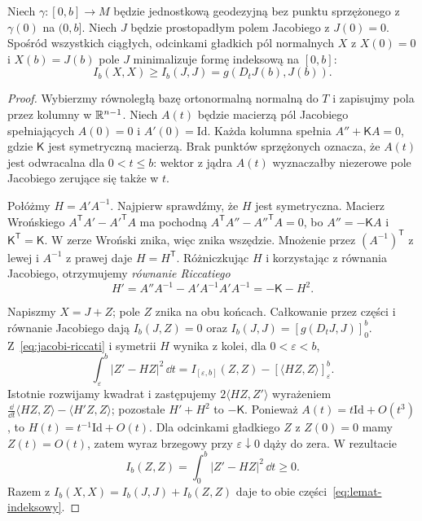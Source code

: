 \begin{lemat}[Indeksowy]
\label{lem:indeksowy-porownanie}
Niech $\gamma:[0,b]\to M$ będzie jednostkową
geodezyjną bez punktu sprzężonego z $\gamma(0)$
na $(0,b]$. Niech $J$ będzie prostopadłym
polem Jacobiego z $J(0)=0$. Spośród wszystkich
ciągłych, odcinkami gładkich pól normalnych $X$ z
$X(0)=0$ i $X(b)=J(b)$ pole $J$ minimalizuje
formę indeksową na $[0,b]$:
\begin{equation}\label{eq:lemat-indeksowy}
 I_b(X,X)\geq I_b(J,J)
       =g(D_tJ(b),J(b)).
\end{equation}
\end{lemat}
\begin{proof}
Wybierzmy równoległą bazę ortonormalną
normalną do $T$ i zapisujmy pola przez
kolumny w $\mathbb{R}^{n-1}$. Niech $A(t)$ będzie
macierzą pól Jacobiego spełniających
$A(0)=0$ i $A'(0)=\mathrm{Id}$.
Każda kolumna spełnia
$A''+\mathsf K A=0$, gdzie $\mathsf K$
jest symetryczną macierzą. Brak punktów
sprzężonych oznacza, że $A(t)$ jest odwracalna
dla $0<t\leq b$: wektor z jądra $A(t)$
wyznaczałby niezerowe pole Jacobiego zerujące
się także w $t$.

Połóżmy $H=A'A^{-1}$. Najpierw sprawdźmy,
że $H$ jest symetryczna. Macierz Wrońskiego
$A^{\mathsf T}A'-A'^{\mathsf T}A$ ma pochodną
$A^{\mathsf T}A''-A''^{\mathsf T}A=0$,
bo $A''=-\mathsf K A$ i $\mathsf K^{\mathsf T}
=\mathsf K$. W zerze Wroński znika, więc
znika wszędzie. Mnożenie przez
$(A^{-1})^{\mathsf T}$ z lewej i $A^{-1}$
z prawej daje $H=H^{\mathsf T}$.
Różniczkując $H$ i korzystając z równania
Jacobiego, otrzymujemy \emph{równanie Riccatiego}
\begin{equation}\label{eq:jacobi-riccati}
 H'=A''A^{-1}-A'A^{-1}A'A^{-1}
    =-\mathsf K-H^2.
\end{equation}

Napiszmy $X=J+Z$; pole $Z$ znika na obu
końcach. Całkowanie przez części i równanie
Jacobiego dają $I_b(J,Z)=0$ oraz
$I_b(J,J)=[g(D_tJ,J)]_0^b$.
Z~\eqref{eq:jacobi-riccati} i symetrii $H$
wynika z kolei, dla $0<\varepsilon<b$,
\[
 \int_\varepsilon^b|Z'-HZ|^2\,\dd t
 =I_{[\varepsilon,b]}(Z,Z)
   -[\langle HZ,Z\rangle]_{\varepsilon}^{b}.
\]
Istotnie rozwijamy kwadrat i zastępujemy
$2\langle HZ,Z'\rangle$ wyrażeniem
$\frac{\dd}{\dd t}\langle HZ,Z\rangle-\langle H'Z,Z\rangle$;
pozostałe $H'+H^2$ to $-\mathsf K$.
Ponieważ $A(t)=t\mathrm{Id}+O(t^3)$,
to $H(t)=t^{-1}\mathrm{Id}+O(t)$.
Dla odcinkami gładkiego $Z$ z $Z(0)=0$
mamy $Z(t)=O(t)$, zatem wyraz brzegowy
przy $\varepsilon\downarrow0$ dąży do zera.
W rezultacie
\[
 I_b(Z,Z)=\int_0^b|Z'-HZ|^2\,\dd t\geq0.
\]
Razem z $I_b(X,X)=I_b(J,J)+I_b(Z,Z)$
daje to obie części~\eqref{eq:lemat-indeksowy}.
\end{proof}

